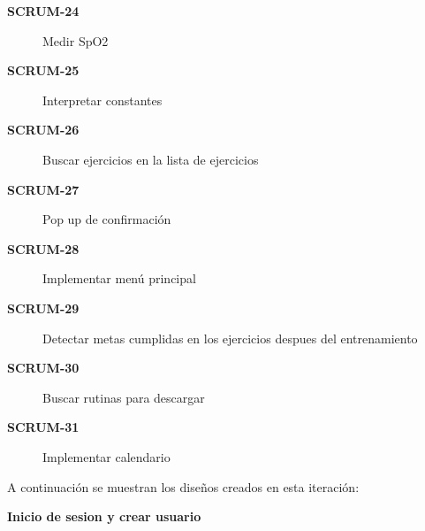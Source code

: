\begin{description}
  \item[\textbf{SCRUM-24}] Medir SpO2
  \item[\textbf{SCRUM-25}] Interpretar constantes
  \item[\textbf{SCRUM-26}] Buscar ejercicios en la lista de ejercicios
  \item[\textbf{SCRUM-27}] Pop up de confirmación
  \item[\textbf{SCRUM-28}] Implementar menú principal
  \item[\textbf{SCRUM-29}] Detectar metas cumplidas en los ejercicios despues del entrenamiento
  \item[\textbf{SCRUM-30}] Buscar rutinas para descargar
  \item[\textbf{SCRUM-31}] Implementar calendario
  
\end{description}

A continuación se muestran los diseños creados en esta iteración:

\textbf{Inicio de sesion y crear usuario}

